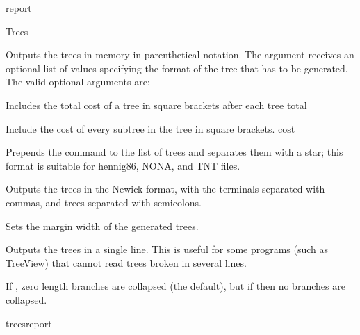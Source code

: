 \begin{command}{report}{}
\begin{arguments}
\begin{argumentgroup}{Trees}
                {Outputs the trees in memory in parenthetical notation. The argument
                 receives an optional list of values
                specifying the format of the tree that has to be generated. The
                valid optional arguments are:  
                
                \begin{description}
                        {Includes the total cost of a tree in square brackets
                        after each tree}
                        {total}

                        {Include the cost of every subtree in the tree in square
                        brackets.}
                        {cost}

                        {Prepends the  command to the list of
                        trees and separates them with a star; this format is
                        suitable for hennig86, NONA, and TNT files.}
                        {}
                        
                        {Outputs the trees in the Newick format, with the
                        terminals separated with commas, and trees separated
                        with semicolons.}
                        {}

                        {Sets the margin width of the generated trees.}
                        {}

                        {Outputs the trees in a single line. This is useful for
                        some programs (such as TreeView) that cannot read
                        trees broken in several
                        lines.}
                        {}

                        {If , zero length branches are collapsed (the
                        default), but if  then no branches are
                        collapsed.}
                        {}
                    \end{description}}
                {treesreport}


\end{argumentgroup}
\end{arguments}
\end{command}
